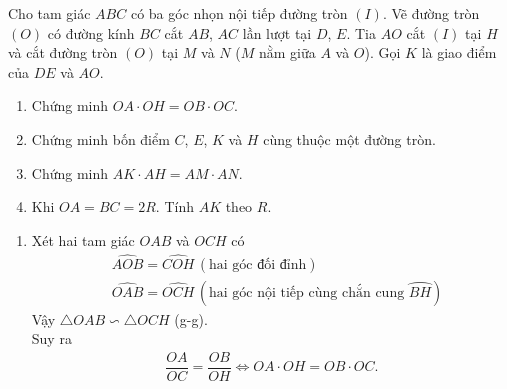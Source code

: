 \begin{ex}%
 Cho tam giác $ABC$ có ba góc nhọn nội tiếp đường tròn $(I)$. Vẽ đường tròn $(O)$ có đường kính $BC$ cắt $AB$, $AC$ lần lượt tại $D$, $E$. Tia $AO$ cắt $(I)$ tại $H$ và cắt đường tròn $(O)$ tại $M$ và $N$ ($M$ nằm giữa $A$ và $O$). Gọi $K$ là giao điểm của $DE$ và $AO$.
 \begin{enumerate}
  \item Chứng minh $OA \cdot OH = OB \cdot OC$.
  \item Chứng minh bốn điểm $C$, $E$, $K$ và $H$ cùng thuộc một đường tròn.
  \item Chứng minh $AK \cdot AH = AM \cdot AN$.
  \item Khi $OA = BC = 2R$. Tính $AK$ theo $R$.
 \end{enumerate}
 \loigiai
  {
  \begin{center}
  \end{center}
  \begin{enumerate}
   \item Xét hai tam giác $OAB$ và $OCH$ có
   \begin{align*}
    & \widehat{AOB} = \widehat{COH} \, (\text{hai góc đối đỉnh})\\
    & \widehat{OAB} = \widehat{OCH} \, (\text{hai góc nội tiếp cùng chắn cung } \wideparen{BH})
   \end{align*}
   Vậy $\triangle OAB \backsim \triangle OCH$ (g-g).\\
   Suy ra
   \begin{align*}
    \dfrac{OA}{OC} = \dfrac{OB}{OH} \Leftrightarrow OA \cdot OH = OB \cdot OC.

\end{align*}
\end{enumerate}}
\end{ex}
